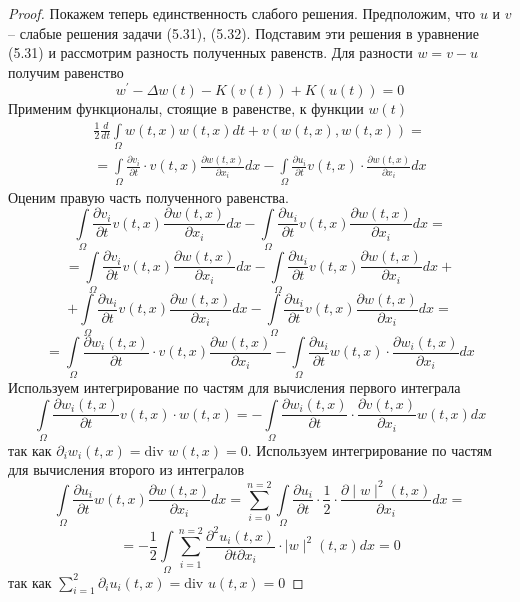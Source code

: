 \begin{proof}
    Покажем теперь единственность слабого решения. Предположим, что $u$ и $v$ -- слабые решения задачи (5.31), (5.32).
    Подставим эти решения в уравнение (5.31) и рассмотрим разность полученных равенств. Для разности $w = v - u$ получим равенство
    $$w^\prime - \Delta w(t) - K(v(t)) + K(u(t)) = 0$$
    Применим функционалы, стоящие в равенстве, к функции $w(t)$
    \begin{equation}\label{eq:5.36}
        \begin{gathered}
            \frac{1}{2}\frac{d}{dt}\int\limits_\Omega w(t,x)w(t,x)dt+v(w(t,x),w(t,x))= \\
            =\int\limits_\Omega\frac{\partial v_i}{\partial t}\cdot v(t,x)\frac{\partial w(t,x)}{\partial x_i}dx-\int\limits_\Omega\frac{\partial u_i}{\partial t}v(t,x)\cdot\frac{\partial w(t,x)}{\partial x_i}dx
        \end{gathered}
    \end{equation}
    Оценим правую часть полученного равенства.
    $$\int\limits_\Omega\frac{\partial v_i}{\partial t}v(t,x)\frac{\partial w(t,x)}{\partial x_i}dx-\int\limits_\Omega\frac{\partial u_i}{\partial t}v(t,x)\frac{\partial w(t,x)}{\partial x_i}dx=$$
    $$=\int\limits_\Omega\frac{\partial v_i}{\partial t}v(t,x)\frac{\partial w(t,x)}{\partial x_i}dx-\int\limits_\Omega\frac{\partial u_i}{\partial t}v(t,x)\frac{\partial w(t,x)}{\partial x_i}dx+$$
    $$+\int\limits_\Omega\frac{\partial u_i}{\partial t}v(t,x)\frac{\partial w(t,x)}{\partial x_i}dx-\int\limits_\Omega\frac{\partial u_i}{\partial t}v(t,x)\frac{\partial w(t,x)}{\partial x_i}dx=$$
    $$=\int\limits_\Omega\frac{\partial w_i(t,x)}{\partial t}\cdot v(t,x)\frac{\partial w(t,x)}{\partial x_i}-\int\limits_\Omega\frac{\partial u_i}{\partial t}w(t,x)\cdot\frac{\partial w_i(t,x)}{\partial x_i}dx$$
    Используем интегрирование по частям для вычисления первого интеграла
    $$\int\limits_\Omega\frac{\partial w_i(t,x)}{\partial t}v(t,x)\cdot w(t,x)=-\int\limits_\Omega\frac{\partial w_i(t,x)}{\partial t}\cdot\frac{\partial v(t,x)}{\partial x_i}w(t,x)dx$$
    так как $\partial_iw_i(t,x) = \textrm{div } w(t,x)=0$. Используем интегрирование по частям для вычисления второго из интегралов
    $$\int\limits_\Omega\frac{\partial u_i}{\partial t}w(t,x)\frac{\partial w(t,x)}{\partial x_i}dx=\sum_{i=0}^{n=2}\int\limits_\Omega\frac{\partial u_i}{\partial t}\cdot\frac{1}{2}\cdot\frac{\partial \mid w\mid^2(t,x)}{\partial x_i}dx=$$
    $$= -\frac{1}{2}\int\limits_\Omega\sum_{i=1}^{n=2}\frac{\partial^2 u_i(t,x)}{\partial t\partial x_i}\cdot\mid w\mid^2(t,x)dx=0$$
    так как $\sum\limits_{i=1}^{2}\partial_iu_i(t,x)= \textrm{div } u(t,x)=0$

\end{proof}

